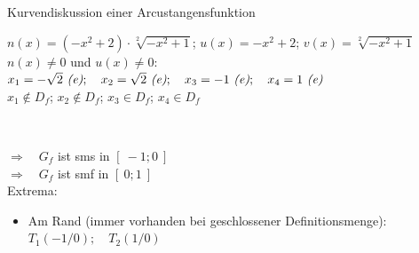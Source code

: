 \begin{Example}{Kurvendiskussion einer Arcustangensfunktion}{}
\begin{itemize}
{{\begin{itemize}
{                $n(x) = \left(-x^{2} + 2\right) \cdot \sqrt[2]{- x^{2} + 1}$; \quad $u(x) = -x^{2} + 2$; \quad $v(x) = \sqrt[2]{- x^{2} + 1}$\\[1.0ex]
                $n(x) \neq 0$ und $u(x) \neq 0$: \\[1.0ex]
                \qquad $x_{1} = -\sqrt{2} \ \text{\textit{(e)}}; \quad x_{2} = \sqrt{2}\ \text{\textit{(e)}}; \quad x_{3} = -1 \ \text{\textit{(e)}}; \quad x_{4} = 1 \ \text{\textit{(e)}}$ \\[1.0ex]
                \qquad $x_{1} \not\in D_{f}$; \quad $x_{2} \not\in D_{f}$; \quad $x_{3} \in D_{f}$; \quad $x_{4} \in D_{f}$ \\
                \begin{minipage}[t]{1.00\linewidth}
                \end{minipage}\\
                }
        \end{itemize}
        }
        $\Rightarrow \quad G_{f}$ ist sms in $\left[ \ -1; 0 \ \right]$\\[1.0ex]
        $\Rightarrow \quad G_{f}$ ist smf in $\left[ \ 0; 1 \ \right]$\\[1.0ex]
        Extrema: \\[-3.0ex]{
            \begin{itemize}
                \item Am Rand (immer vorhanden bei geschlossener Definitionsmenge): \\[1.0ex]{
                    $T_{1}\left(-1 / 0\right); \quad T_{2}\left(1 / 0\right)$
}
\end{itemize}}}
\end{itemize}
\end{Example}
